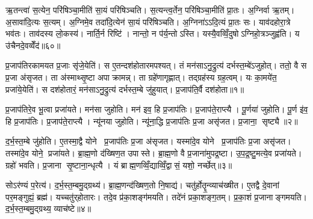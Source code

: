 ऋ॒तन्त्वा॑ स॒त्येन॒ परि॑षिञ्चा॒मीति॑ सा॒यं परि॑षिञ्चति। स॒त्यन्त्व॒र्तेन॒ परि॑षिञ्चा॒मीति॑ प्रा॒तः। अ॒ग्निर्वा ऋ॒तम्। अ॒सावा॑दि॒त्यः स॒त्यम्। अ॒ग्निमे॒व तदा॑दि॒त्येन॑ सा॒यं परि॑षिञ्चति। अ॒ग्निना॑ऽऽदि॒त्यं प्रा॒तः सः। याव॑दहोरा॒त्रे भव॑तः। ताव॑दस्य लो॒कस्य॑। नार्ति॒र्न रिष्टि॑। नान्तो॒ न प॑र्य॒न्तोऽस्ति। यस्यै॒वव्विँ॒दुषोऽग्निहो॒त्रञ्जुह्व॑ति। य उ॑चैनदे॒वव्वेँद॑॥६०॥



\clearpage
{}
\setcounter{anuvakam}{0}
प्र॒जाप॑तिरकामयत प्र॒जाः सृ॑जे॒येति॑। स ए॒तन्दश॑होतारमपश्यत्। तं मन॑साऽनु॒द्रुत्य॑ दर्भस्त॒म्बे॑ऽजुहोत्। ततो॒ वै स प्र॒जा अ॑सृजत। ता अ॑स्माथ्सृ॒ष्टा अपाक्रामन्न्। ता ग्रहे॑णागृह्णात्। तद्ग्रह॑स्य ग्रह॒त्वम्। यः का॒मये॑त॒ प्रजा॑ये॒येति॑। स दश॑होतारं॒ मन॑साऽनु॒द्रुत्य॑ दर्भस्त॒म्बे जु॑हुयात्। प्र॒जाप॑ति॒र्वै दश॑होता॥१॥

प्र॒जाप॑तिरे॒व भू॒त्वा प्रजा॑यते। मन॑सा जुहोति। मन॑ इव॒ हि प्र॒जाप॑तिः। प्र॒जाप॑ते॒राप्त्यै। पू॒र्णया॑ जुहोति। पू॒र्ण इ॑व॒ हि प्र॒जाप॑तिः। प्र॒जाप॑ते॒राप्त्यै। न्यू॑नया जुहोति। न्यू॑ना॒द्धि प्र॒जाप॑तिः प्र॒जा असृ॑जत। प्र॒जाना॒ सृष्ट्यै॥२॥

द॒र्भ॒स्त॒म्बे जु॑होति। ए॒तस्मा॒द्वै योने प्र॒जाप॑तिः प्र॒जा अ॑सृजत। यस्मा॑दे॒व योने प्र॒जाप॑तिः प्र॒जा असृ॑जत। तस्मा॑दे॒व योने॒ प्रजा॑यते। ब्रा॒ह्म॒णो द॑ख्षिण॒त उपास्ते। ब्रा॒ह्म॒णो वै प्र॒जाना॑मुपद्र॒ष्टा। उ॒प॒द्र॒ष्टु॒मत्ये॒व प्रजा॑यते। ग्रहो॑ भवति। प्र॒जाना सृ॒ष्टाना॒न्धृत्यै। यं ब्राह्म॒णव्विँ॒द्याव्विँ॒द्वासं॒ यशो॒ नर्च्छेत्॥३॥

सोऽर॑ण्यं प॒रेत्य॑। द॒र्भ॒स्त॒म्बमु॒द्ग्रथ्य॑। ब्रा॒ह्म॒णन्द॑ख्षिण॒तो नि॒षाद्य॑। चतु॑र्होतॄ॒न्व्याच॑ख्षीत। ए॒तद्वै दे॒वानां पर॒मङ्गुह्यं॒ ब्रह्म॑। यच्चतु॑र्‌होतारः। तदे॒व प्र॑का॒शङ्ग॑मयति। तदे॑नं प्रका॒शङ्ग॒तम्। प्र॒का॒शं प्र॒जानाङ्गमयति। द॒र्भ॒स्त॒म्बमु॒द्ग्रथ्य॒ व्याच॑ष्टे॥४॥

